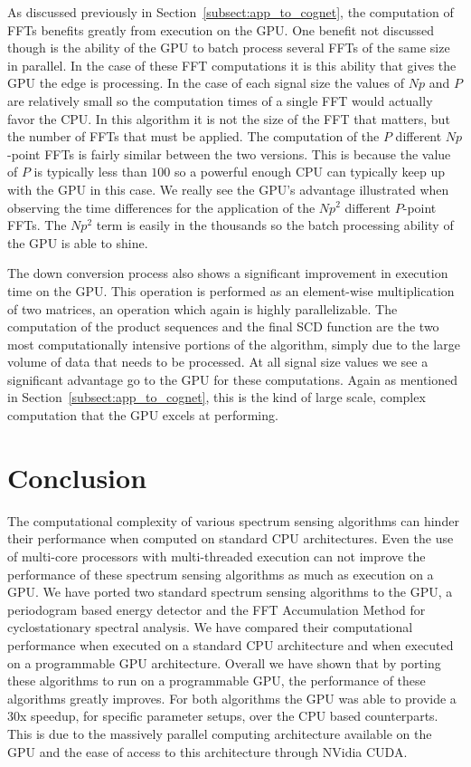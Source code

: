 As discussed previously in Section~\ref{subsect:app_to_cognet}, the computation of FFTs benefits greatly from execution on the GPU.  One benefit not discussed though is the ability of the GPU to batch process several FFTs of the same size in parallel.  In the case of these FFT computations it is this ability that gives the GPU the edge is processing.  In the case of each signal size the values of $Np$ and $P$ are relatively small so the computation times of a single FFT would actually favor the CPU.  In this algorithm it is not the size of the FFT that matters, but the number of FFTs that must be applied.  The computation of the $P$ different $Np$-point FFTs is fairly similar between the two versions.  This is because the value of $P$ is typically less than $100$ so a powerful enough CPU can typically keep up with the GPU in this case.  We really see the GPU's advantage illustrated when observing the time differences for the application of the $Np^2$ different $P$-point FFTs.  The $Np^2$ term is easily in the thousands so the batch processing ability of the GPU is able to shine.

The down conversion process also shows a significant improvement in execution time on the GPU.  This operation is performed as an element-wise multiplication of two matrices, an operation which again is highly parallelizable.  The computation of the product sequences and the final SCD function are the two most computationally intensive portions of the algorithm, simply due to the large volume of data that needs to be processed.  At all signal size values we see a significant advantage go to the GPU for these computations.  Again as mentioned in Section~\ref{subsect:app_to_cognet}, this is the kind of large scale, complex computation that the GPU excels at performing.

\section{Conclusion}
\label{sect:gpu_conclusion}
The computational complexity of various spectrum sensing algorithms can hinder their performance when computed on standard CPU architectures.  Even the use of multi-core processors with multi-threaded execution can not improve the performance of these spectrum sensing algorithms as much as execution on a GPU.  We have ported two standard spectrum sensing algorithms to the GPU, a periodogram based energy detector and the FFT Accumulation Method for cyclostationary spectral analysis.  We have compared their computational performance  when executed on a standard CPU architecture and when executed on a programmable GPU architecture.  Overall we have shown that by porting these algorithms to run on a programmable GPU, the performance of these algorithms greatly improves.  For both algorithms the GPU was able to provide a 30x speedup, for specific parameter setups, over the CPU based counterparts.  This is due to the massively parallel computing architecture available on the GPU and the ease of access to this architecture through NVidia CUDA.


